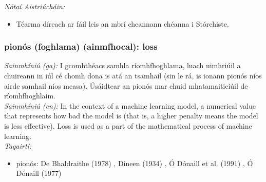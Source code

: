  \noindent \textit{Nótaí Aistriúcháin:}
\begin{itemize}
	\item Téarma díreach ar fáil leis an mbrí cheannann chéanna i Stórchiste.
\end{itemize}


\subsubsection*{pionós (foghlama) (ainmfhocal): loss}
 \noindent \textit{Sainmhíniú (ga):} I gcomhthéacs samhla ríomhfhoghlama, luach uimhriúil a chuireann in iúl cé chomh dona is atá an tsamhail (sin le rá, is ionann pionós níos airde samhail níos measa). Úsáidtear an pionós mar chuid mhatamaiticiúil de ríomhfhoghlaim.
\\
 \noindent \textit{Sainmhíniú (en):} In the context of a machine learning model, a numerical value that represents how bad the model is (that is, a higher penalty means the model is less effective). Loss is used as a part of the mathematical process of machine learning.
\\
 \noindent \textit{Tagairtí:}
\begin{itemize}
	\item pionós: De Bhaldraithe (1978) \cite{de-bhaldraithe}, Dineen (1934) \cite{dineen}, Ó Dónaill et al. (1991) \cite{focloir-beag}, Ó Dónaill (1977) \cite{odonaill}
\end{itemize}

